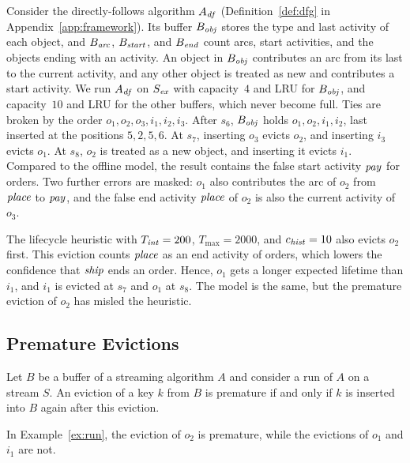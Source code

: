 \begin{example}
\label{ex:run}
Consider the directly-follows algorithm $A_{\mathit{df}}$
(Definition~\ref{def:dfg} in Appendix~\ref{app:framework}).
Its buffer $B_{\mathit{obj}}$ stores the type and last activity of each object,
and $B_{\mathit{arc}}$, $B_{\mathit{start}}$, and $B_{\mathit{end}}$ count arcs, start
activities, and the objects ending with an activity.
An object in $B_{\mathit{obj}}$ contributes an arc from its last to the current
activity, and any other object is treated as new and contributes a start
activity.
We run $A_{\mathit{df}}$ on $S_{\mathit{ex}}$ with capacity~$4$ and LRU for
$B_{\mathit{obj}}$, and capacity~$10$ and LRU for the other buffers, which never
become full.
Ties are broken by the order $o_1, o_2, o_3, i_1, i_2, i_3$.
After $s_6$, $B_{\mathit{obj}}$ holds $o_1, o_2, i_1, i_2$, last inserted at the
positions $5, 2, 5, 6$.
At $s_7$, inserting $o_3$ evicts $o_2$, and inserting $i_3$ evicts $o_1$.
At $s_8$, $o_2$ is treated as a new object, and inserting it evicts $i_1$.
Compared to the offline model, the result contains the false start activity
$\mathit{pay}$ for orders.
Two further errors are masked: $o_1$ also contributes the arc of $o_2$ from
$\mathit{place}$ to $\mathit{pay}$, and the false end activity $\mathit{place}$ of $o_2$
is also the current activity of $o_3$.

The lifecycle heuristic with $T_{\mathit{int}} = 200$, $T_{\max} = 2000$, and
$c_{\mathit{hist}} = 10$ also evicts $o_2$ first.
This eviction counts $\mathit{place}$ as an end activity of orders, which lowers
the confidence that $\mathit{ship}$ ends an order.
Hence, $o_1$ gets a longer expected lifetime than $i_1$, and $i_1$ is evicted
at $s_7$ and $o_1$ at $s_8$.
The model is the same, but the premature eviction of $o_2$ has misled the
heuristic.
\end{example}

\subsection{Premature Evictions}
\label{sec:framework:premature}

\begin{definition}
\label{def:premature}
Let $B$ be a buffer of a streaming algorithm $A$ and consider a run of $A$ on
a stream $S$.
An eviction of a key $k$ from $B$ is premature if and only if $k$ is inserted
into $B$ again after this eviction.
\end{definition}

In Example~\ref{ex:run}, the eviction of $o_2$ is premature, while the
evictions of $o_1$ and $i_1$ are not.

